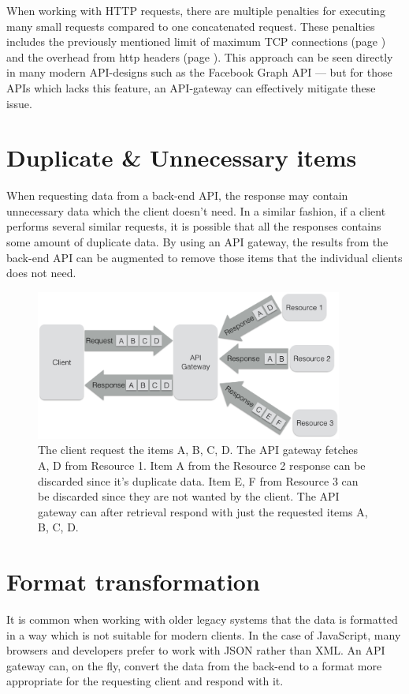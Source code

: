 \documentclass{cslthse-msc}
\begin{document}
When working with HTTP requests, there are multiple penalties for executing many small requests compared to one concatenated request. These penalties includes the previously mentioned limit of maximum TCP connections (page \pageref{max_tcp}) and the overhead from http headers (page \pageref{headers}). This approach can be seen directly in many modern API-designs such as the Facebook Graph API\cite{facebook_batch_requests} --- but for those APIs which lacks this feature, an API-gateway can effectively mitigate these issue.

\section{Duplicate \& Unnecessary items}
When requesting data from a back-end API, the response may contain unnecessary data which the client doesn't need. In a similar fashion, if a client performs several similar requests, it is possible that all the responses contains some amount of duplicate data. By using an API gateway, the results from the back-end API can be augmented to remove those items that the individual clients does not need.

\begin{figure}[H]
  \centering
    \begin{center}
      \includegraphics[width=0.9\textwidth]{images/api_gateway_duplicate.png}
    \end{center}
  \caption{The client request the items A, B, C, D. The API gateway fetches A, D from Resource 1. Item A from the Resource 2 response can be discarded since it's duplicate data. Item E, F from Resource 3 can be discarded since they are not wanted by the client. The API gateway can after retrieval respond with just the requested items A, B, C, D.}
\end{figure}

\section{Format transformation}
It is common when working with older legacy systems that the data is formatted in a way which is not suitable for modern clients. In the case of JavaScript, many browsers and developers prefer to work with JSON rather than XML. An API gateway can, on the fly, convert the data from the back-end to a format more appropriate for the requesting client and respond with it.
\end{document}
